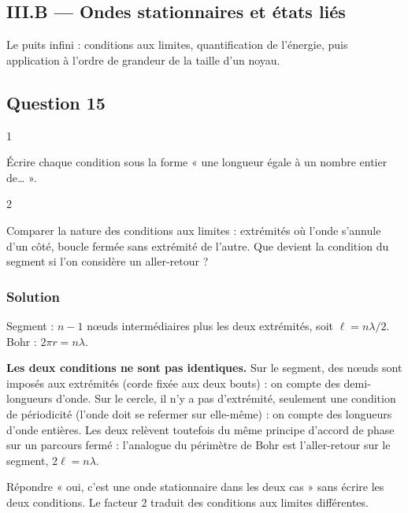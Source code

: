 \documentclass[11pt,a4paper]{article}
\begin{document}
\hypertarget{iii.b-ondes-stationnaires-et-uxe9tats-liuxe9s}{%
\subsection{III.B --- Ondes stationnaires et états liés}\label{iii.b-ondes-stationnaires-et-uxe9tats-liuxe9s}}

Le puits infini : conditions aux limites, quantification de l'énergie, puis application à l'ordre de grandeur de la taille d'un noyau.

\hypertarget{question-15}{%
\subsection{Question 15}\label{question-15}}

\begin{indication}{1}

Écrire chaque condition sous la forme « une longueur égale à un nombre entier de\ldots{} ».

\end{indication}

\begin{indication}{2}

Comparer la nature des conditions aux limites : extrémités où l'onde s'annule d'un côté, boucle fermée sans extrémité de l'autre. Que devient la condition du segment si l'on considère un aller-retour ?

\end{indication}

\hypertarget{solution-14}{%
\subsubsection{Solution}\label{solution-14}}

Segment : \(n-1\) nœuds intermédiaires plus les deux extrémités, soit \(\ell=n\lambda/2\). Bohr : \(2\pi r=n\lambda\).

\textbf{Les deux conditions ne sont pas identiques.} Sur le segment, des nœuds sont imposés aux extrémités (corde fixée aux deux bouts) : on compte des demi-longueurs d'onde. Sur le cercle, il n'y a pas d'extrémité, seulement une condition de périodicité (l'onde doit se refermer sur elle-même) : on compte des longueurs d'onde entières. Les deux relèvent toutefois du même principe d'accord de phase sur un parcours fermé : l'analogue du périmètre de Bohr est l'aller-retour sur le segment, \(2\ell=n\lambda\).

\begin{piege}

Répondre « oui, c'est une onde stationnaire dans les deux cas » sans écrire les deux conditions. Le facteur 2 traduit des conditions aux limites différentes.

\end{piege}
\end{document}
